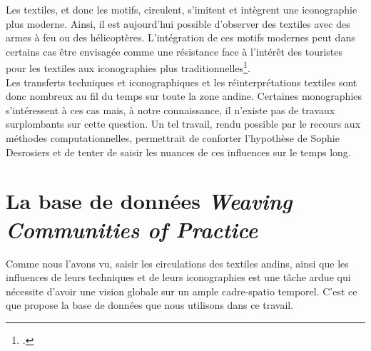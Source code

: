 \noindent Les textiles, et donc les motifs, circulent, s'imitent et intègrent une iconographie plus moderne. Ainsi, il est aujourd'hui possible d'observer des textiles avec des armes à feu ou des hélicoptères. L'intégration de ces motifs modernes peut dans certains cas être envisagée comme une résistance face à l'intérêt des touristes pour les textiles aux iconographies plus traditionnelles\footcite[p.~247]{zornModernTraditionsImpact1990}.\\

Les transferts techniques et iconographiques et les réinterprétations textiles sont donc nombreux au fil du temps sur toute la zone andine. Certaines monographies s'intéressent à ces cas mais, à notre connaissance, il n'existe pas de travaux surplombants sur cette question. Un tel travail, rendu possible par le recours aux méthodes computationnelles, permettrait de conforter l'hypothèse de Sophie Desrosiers et de tenter de saisir les nuances de ces influences sur le temps long.

\section{La base de données \textit{Weaving Communities of Practice}}

Comme nous l'avons vu, saisir les circulations des textiles andins, ainsi que les influences de leurs techniques et de leurs iconographies est une tâche ardue qui nécessite d'avoir une vision globale sur un ample cadre-spatio temporel. C'est ce que propose la base de données que nous utilisons dans ce travail.

